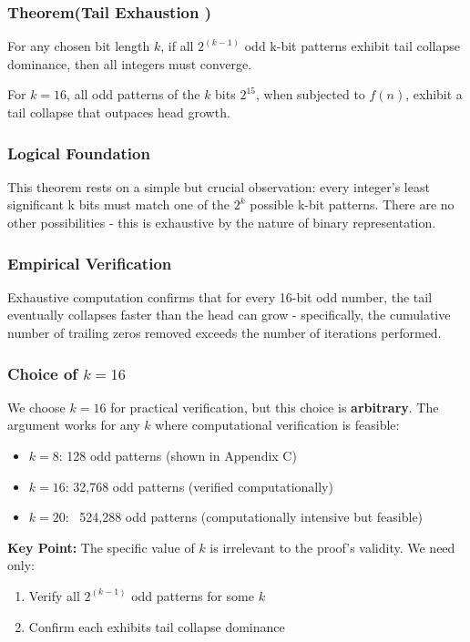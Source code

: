 \documentclass[10pt,letterpaper]{article}
\begin{document}
\subsubsection{Theorem(Tail Exhaustion )}

For any chosen bit length $k$, if all $2^{(k-1)}$ odd k-bit patterns exhibit tail collapse dominance, then all integers must converge.

For $k=16$, all odd patterns of the $k$ bits $2^{15}$, when subjected to $f(n)$, exhibit a tail collapse that outpaces head growth.

\subsubsection{Logical Foundation} 
This theorem rests on a simple but crucial observation: every integer's least significant k bits must match one of the $2^k$ possible k-bit patterns. There are no other possibilities - this is exhaustive by the nature of binary representation.

\subsubsection{Empirical Verification}
Exhaustive computation confirms that for every 16-bit odd number, the tail eventually collapses faster than the head can grow - specifically, the cumulative number of trailing zeros removed exceeds the number of iterations performed.

\subsubsection{Choice of \texorpdfstring{$k=16$}{k=16}}
We choose $k=16$ for practical verification, but this choice is \textbf{arbitrary}. The argument works for any $k$ where computational verification is feasible:

\begin{itemize}
    \item $k=8$: 128 odd patterns (shown in Appendix C)
    \item $k=16$: 32,768 odd patterns (verified computationally)
    \item $k=20$: ~524,288 odd patterns (computationally intensive but feasible)
\end{itemize}

\textbf{Key Point:} The specific value of $k$ is irrelevant to the proof's validity. We need only:
\begin{enumerate}
    \item Verify all $2^{(k-1)}$ odd patterns for some $k$
    \item Confirm each exhibits tail collapse dominance
\end{enumerate}
\end{document}
